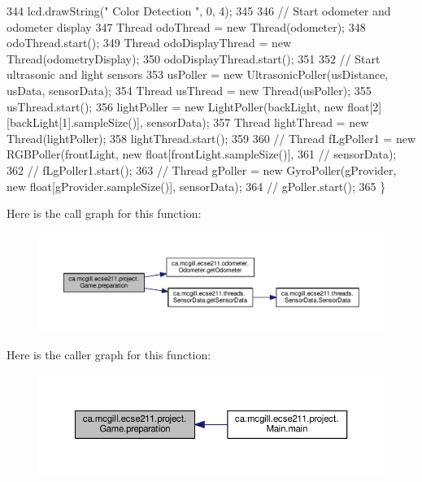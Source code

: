 \begin{DoxyCode}
344     lcd.drawString("  Color Detection  ", 0, 4);
345 
346     \textcolor{comment}{// Start odometer and odometer display}
347     Thread odoThread = new Thread(odometer);
348     odoThread.start();
349     Thread odoDisplayThread = new Thread(odometryDisplay);
350     odoDisplayThread.start();
351 
352     \textcolor{comment}{// Start ultrasonic and light sensors}
353     usPoller = new UltrasonicPoller(usDistance, usData, sensorData);
354     Thread usThread = new Thread(usPoller);
355     usThread.start();
356     lightPoller = new LightPoller(backLight, new \textcolor{keywordtype}{float}[2][backLight[1].sampleSize()], sensorData);
357     Thread lightThread = new Thread(lightPoller);
358     lightThread.start();
359 
360     \textcolor{comment}{// Thread fLgPoller1 = new RGBPoller(frontLight, new float[frontLight.sampleSize()],}
361     \textcolor{comment}{// sensorData);}
362     \textcolor{comment}{// fLgPoller1.start();}
363     \textcolor{comment}{// Thread gPoller = new GyroPoller(gProvider, new float[gProvider.sampleSize()], sensorData);}
364     \textcolor{comment}{// gPoller.start();}
365   \}
\end{DoxyCode}
Here is the call graph for this function\+:
\nopagebreak
\begin{figure}[H]
\begin{center}
\leavevmode
\includegraphics[width=350pt]{enumca_1_1mcgill_1_1ecse211_1_1project_1_1_game_a1bcbd1c19309c65a6887ae19bde66765_cgraph}
\end{center}
\end{figure}
Here is the caller graph for this function\+:
\nopagebreak
\begin{figure}[H]
\begin{center}
\leavevmode
\includegraphics[width=350pt]{enumca_1_1mcgill_1_1ecse211_1_1project_1_1_game_a1bcbd1c19309c65a6887ae19bde66765_icgraph}
\end{center}
\end{figure}
\mbox{\label{enumca_1_1mcgill_1_1ecse211_1_1project_1_1_game_aff9431d27d78c8b228f468d8ad889a9a}} 
